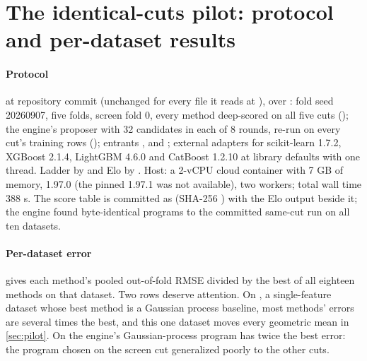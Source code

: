 \section{The identical-cuts pilot: protocol and per-dataset results}
\label{app:pilot}

\paragraph{Protocol}  at repository commit  (unchanged for every
file it reads at ), over : fold seed 20260907, five folds, screen fold
0, every method deep-scored on all five cuts (); the engine's proposer with 32 candidates
in each of 8 rounds, re-run on every cut's training rows (); entrants ,  and ; external adapters for scikit-learn 1.7.2,
XGBoost 2.1.4, LightGBM 4.6.0 and CatBoost 1.2.10 at library defaults with one thread. Ladder by
 and Elo by . Host: a 2-vCPU cloud container with 7 GB of
memory,  1.97.0 (the pinned 1.97.1 was not available), two workers; total wall time 388 s.
The score table is committed as  (SHA-256
) with the Elo output beside it; the engine found byte-identical programs to
the committed same-cut run on all ten datasets.

\paragraph{Per-dataset error}  gives each method's pooled out-of-fold RMSE divided by
the best of all eighteen methods on that dataset. Two rows deserve attention. On , a
single-feature dataset whose best method is a Gaussian process baseline, most methods' errors are
several times the best, and this one dataset moves every geometric mean in \cref{sec:pilot}. On
 the engine's Gaussian-process program has twice the best error: the program chosen on
the screen cut generalized poorly to the other cuts.

